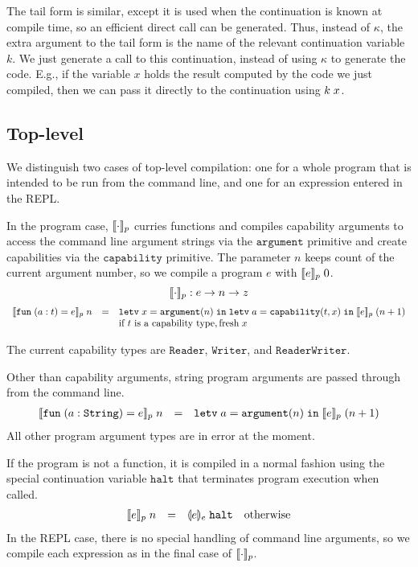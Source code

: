\documentclass[11pt]{article}
\newcommand{\kw}[1]{\mathtt{#1}}
\begin{document}
The tail form is similar, except it is used when the continuation is known at compile time, so an efficient direct call can be generated.
Thus, instead of $\kappa$, the extra argument to the tail form is the name of the relevant continuation variable $k$.
We just generate a call to this continuation, instead of using $\kappa$ to generate the code.
E.g., if the variable $x$ holds the result computed by the code we just compiled, then we can pass it directly to the continuation using $\appc{k}{x}$.

\subsection*{Top-level}

We distinguish two cases of top-level compilation: one for a whole program that is intended to be run from the command line, and one for an expression entered in the REPL.

In the program case, $\cmpn{p}$ curries functions and compiles capability arguments to access the command line argument strings via the $\kw{argument}$ primitive and create capabilities via the $\kw{capability}$ primitive.
The parameter $n$ keeps count of the current argument number, so we compile a program $e$ with $\cmpin{p}{e}{0}$.
\[
    \cmpn{p} : e -> n -> z
\]
\[
\begin{array}{rcll}
\cmpin{p}{\fune{\arge{a}{t}}{e}}{n} & = &
  \letv{x}{\prmv{\kw{argument}}{n}}{\letv{a}{\prmv{\kw{capability}}{t,x}}{\cmpin{p}{e}{(n + 1)}}} \\
  & &
  \text{if $t$ is a capability type}, \fresh{x} \\
\end{array}
\]

The current capability types are $\kw{Reader}$, $\kw{Writer}$, and $\kw{ReaderWriter}$.

Other than capability arguments, string program arguments are passed through from the command line.
\[
\begin{array}{rcll}
\cmpin{p}{\fune{\arge{a}{\kw{String}}}{e}}{n} & = &
  \letv{a}{\prmv{\kw{argument}}{n}}{\cmpin{p}{e}{(n + 1)}}
  \\
\end{array}
\]
All other program argument types are in error at the moment.

If the program is not a function, it is compiled in a normal fashion using the special continuation variable $\kw{halt}$ that terminates program execution when called.
\[
\begin{array}{rcll}
\cmpin{p}{e}{n} & = &
  \tcmpin{e}{e}{\kw{halt}} &
  \text{otherwise}
\end{array}
\]
In the REPL case, there is no special handling of command line arguments, so we compile each expression as in the final case of $\cmpn{p}$.
\end{document}

